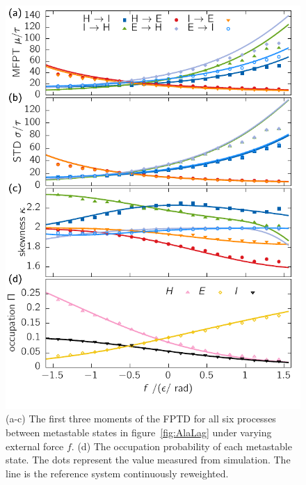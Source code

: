 \begin{figure}
\centering 
 \includegraphics{../plots/Frew/mom_2001.pdf}
 \caption[The first three moments and the population of metastable states for the tetraalanine peptide for varying driving along the dihedral angle.]{(a-c) The first three moments of the FPTD for all six processes between metastable states in figure~\ref{fig:AlaLag} under varying external force $f$. (d) The occupation probability of each metastable state. The dots represent the value measured from simulation. The line is the reference system continuously reweighted.   }
 \label{fig:mom2001}
\end{figure}


